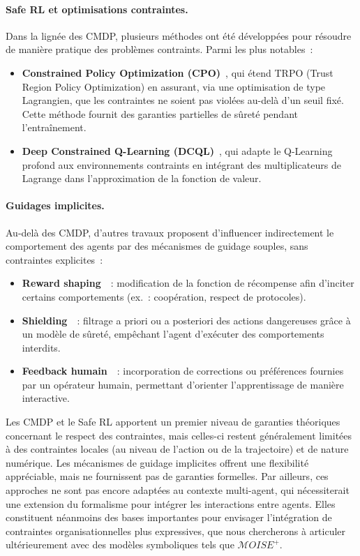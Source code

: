 \paragraph{Safe RL et optimisations contraintes.}
Dans la lignée des CMDP, plusieurs méthodes ont été développées pour résoudre de manière pratique
des problèmes contraints. Parmi les plus notables~:
\begin{itemize}
  \item \textbf{Constrained Policy Optimization (CPO)}~\cite{achiam2017constrained},
        qui étend TRPO (Trust Region Policy Optimization) en assurant,
        via une optimisation de type Lagrangien, que les contraintes ne soient
        pas violées au-delà d’un seuil fixé. Cette méthode fournit des garanties
        partielles de sûreté pendant l’entraînement.
  \item \textbf{Deep Constrained Q-Learning (DCQL)}~\cite{kalweit2020deep},
        qui adapte le Q-Learning profond aux environnements contraints
        en intégrant des multiplicateurs de Lagrange dans l’approximation
        de la fonction de valeur.
\end{itemize}

\paragraph{Guidages implicites.}
Au-delà des CMDP, d’autres travaux proposent d’influencer indirectement
le comportement des agents par des mécanismes de guidage souples,
sans contraintes explicites~:
\begin{itemize}
  \item \textbf{Reward shaping}~\cite{ng1999policy}~: modification de la fonction
        de récompense afin d’inciter certains comportements (ex.~: coopération,
        respect de protocoles).
  \item \textbf{Shielding}~\cite{amodei2016concrete}~: filtrage a priori ou a posteriori
        des actions dangereuses grâce à un modèle de sûreté,
        empêchant l’agent d’exécuter des comportements interdits.
  \item \textbf{Feedback humain}~\cite{warnell2018deep}~: incorporation de corrections
        ou préférences fournies par un opérateur humain,
        permettant d’orienter l’apprentissage de manière interactive.
\end{itemize}

Les CMDP et le Safe RL apportent un premier niveau de garanties théoriques concernant le respect des contraintes, mais celles-ci restent généralement limitées à des contraintes locales (au niveau de l’action ou de la trajectoire) et de nature numérique. Les mécanismes de guidage implicites offrent une flexibilité appréciable, mais ne fournissent pas de garanties formelles. Par ailleurs, ces approches ne sont pas encore adaptées au contexte multi-agent, qui nécessiterait une extension du formalisme pour intégrer les interactions entre agents. Elles constituent néanmoins des bases importantes pour envisager l’intégration de contraintes organisationnelles plus expressives, que nous chercherons à articuler ultérieurement avec des modèles symboliques tels que $\mathcal{M}OISE^+$.

